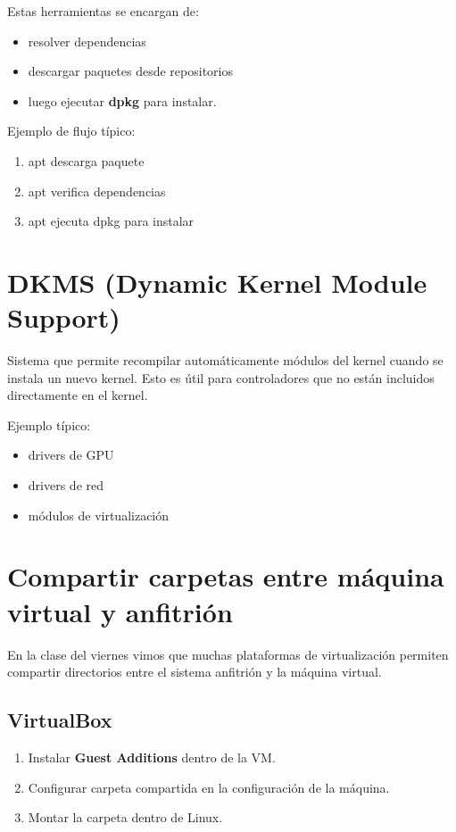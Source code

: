 \documentclass[11pt, letterpaper]{article}
\begin{document}
Estas herramientas se encargan de:

\begin{itemize}
\item resolver dependencias
\item descargar paquetes desde repositorios
\item luego ejecutar \textbf{dpkg} para instalar.
\end{itemize}

Ejemplo de flujo típico:

\begin{enumerate}
\item apt descarga paquete
\item apt verifica dependencias
\item apt ejecuta dpkg para instalar
\end{enumerate}
\section{DKMS (Dynamic Kernel Module Support)}
\label{sec:org9ecd078}

Sistema que permite recompilar automáticamente módulos del kernel cuando se instala un nuevo kernel.
Esto es útil para controladores que no están incluidos directamente en el kernel.

Ejemplo típico:

\begin{itemize}
\item drivers de GPU
\item drivers de red
\item módulos de virtualización
\end{itemize}
\section{Compartir carpetas entre máquina virtual y anfitrión}
\label{sec:org32e8156}

En la clase del viernes vimos que muchas plataformas de virtualización permiten compartir directorios 
entre el sistema anfitrión y la máquina virtual.
\subsection{VirtualBox}
\label{sec:org2c182f6}

\begin{enumerate}
\item Instalar \textbf{Guest Additions} dentro de la VM.
\item Configurar carpeta compartida en la configuración de la máquina.
\item Montar la carpeta dentro de Linux.
\end{enumerate}
\end{document}
